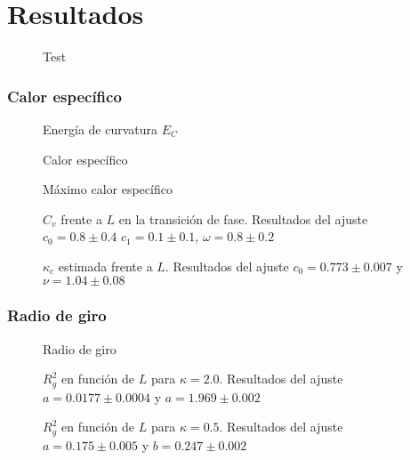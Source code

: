 \chapter{Resultados}
\begin{figure}[h]
\centering
 
\caption{Test}
\end{figure}
\subsection{Calor específico}
\begin{figure}[h]
\centering
 
\caption{Energía de curvatura $E_C$}
\end{figure}

\begin{figure}[h]
  \centering
  
  \caption{Calor específico}
\end{figure}

\begin{figure}[h]
  \centering
  
  \caption{Máximo calor específico}
\end{figure}

\begin{figure}[h]
  \centering
  
  \caption{$C_v$ frente a $L$ en la transición de fase. Resultados del ajuste
    $c_0=0.8\pm 0.4$ $c_1=0.1\pm 0.1$,  $\omega=0.8\pm 0.2$ }
\end{figure}

\begin{figure}[h]
  \centering
  
  \caption{$\kappa_c$ estimada frente a $L$. Resultados del ajuste $c_0=0.773\pm 0.007$ y $\nu=1.04\pm 0.08$ } 
\end{figure}
\clearpage
\subsection{Radio de giro}
\begin{figure}[h]
  \centering
  
  \caption{Radio de giro}
\end{figure}

\begin{figure}[h]
  \centering
  
  \caption{$R^2_g$ en función de $L$ para $\kappa=2.0$. Resultados del ajuste
    $a=0.0177\pm 0.0004$ y $a=1.969\pm 0.002$}
\end{figure}

\begin{figure}[h]
  \centering
  
  \caption{$R^2_g$ en función de $L$ para $\kappa=0.5$. Resultados del ajuste
    $a=0.175\pm 0.005$ y $b=0.247\pm 0.002$}
\end{figure}
